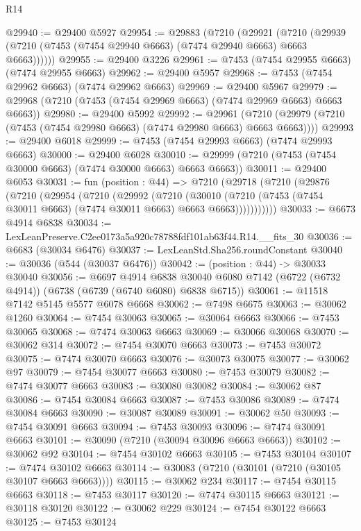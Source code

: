 \begin{lexlean}{R14}
\begin{coremodule}
@29940 := @29400 @5927
@29954 := @29883
    (@7210
      (@29921
        (@7210 (@29939 (@7210 (@7453 (@7454 @29940 @6663) (@7474 @29940 @6663) @6663 @6663))))))
@29955 := @29400 @3226
@29961 := @7453 (@7454 @29955 @6663) (@7474 @29955 @6663)
@29962 := @29400 @5957
@29968 := @7453 (@7454 @29962 @6663) (@7474 @29962 @6663)
@29969 := @29400 @5967
@29979 := @29968 (@7210 (@7453 (@7454 @29969 @6663) (@7474 @29969 @6663) @6663 @6663))
@29980 := @29400 @5992
@29992 := @29961
    (@7210 (@29979 (@7210 (@7453 (@7454 @29980 @6663) (@7474 @29980 @6663) @6663 @6663))))
@29993 := @29400 @6018
@29999 := @7453 (@7454 @29993 @6663) (@7474 @29993 @6663)
@30000 := @29400 @6028
@30010 := @29999 (@7210 (@7453 (@7454 @30000 @6663) (@7474 @30000 @6663) @6663 @6663))
@30011 := @29400 @6053
@30031 := fun (position : @44) =>
  @7210
    (@29718
      (@7210
        (@29876
          (@7210
            (@29954
              (@7210
                (@29992
                  (@7210
                    (@30010
                      (@7210 (@7453 (@7454 @30011 @6663) (@7474 @30011 @6663) @6663 @6663)))))))))))
@30033 := @6673 @4914 @6838
@30034 := LexLeanPreserve.C2ee0173a5a920c78788fdf101ab63f44.R14.__fits_30
@30036 := @6683 (@30034 @6476)
@30037 := LexLeanStd.Sha256.roundConstant
@30040 := @30036 (@544 (@30037 @6476))
@30042 := (position : @44) -> @30033 @30040
@30056 := @6697
    @4914
    @6838
    @30040
    @6080
    @7142
    (@6722 (@6732 @4914))
    (@6738 (@6739 (@6740 @6080) @6838 @6715))
@30061 := @11518 @7142 @5145 @5577 @6078 @6668
@30062 := @7498 @6675
@30063 := @30062 @1260
@30064 := @7454 @30063
@30065 := @30064 @6663
@30066 := @7453 @30065
@30068 := @7474 @30063 @6663
@30069 := @30066 @30068
@30070 := @30062 @314
@30072 := @7454 @30070 @6663
@30073 := @7453 @30072
@30075 := @7474 @30070 @6663
@30076 := @30073 @30075
@30077 := @30062 @97
@30079 := @7454 @30077 @6663
@30080 := @7453 @30079
@30082 := @7474 @30077 @6663
@30083 := @30080 @30082
@30084 := @30062 @87
@30086 := @7454 @30084 @6663
@30087 := @7453 @30086
@30089 := @7474 @30084 @6663
@30090 := @30087 @30089
@30091 := @30062 @50
@30093 := @7454 @30091 @6663
@30094 := @7453 @30093
@30096 := @7474 @30091 @6663
@30101 := @30090 (@7210 (@30094 @30096 @6663 @6663))
@30102 := @30062 @92
@30104 := @7454 @30102 @6663
@30105 := @7453 @30104
@30107 := @7474 @30102 @6663
@30114 := @30083 (@7210 (@30101 (@7210 (@30105 @30107 @6663 @6663))))
@30115 := @30062 @234
@30117 := @7454 @30115 @6663
@30118 := @7453 @30117
@30120 := @7474 @30115 @6663
@30121 := @30118 @30120
@30122 := @30062 @229
@30124 := @7454 @30122 @6663
@30125 := @7453 @30124

\end{coremodule}
\end{lexlean}
